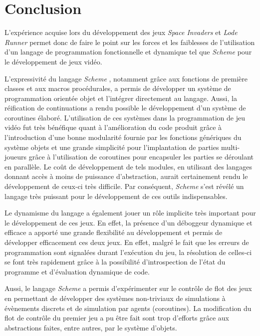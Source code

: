 \documentclass[12pt,twoside,letterpaper,francais]{book}
\newcommand{\lr}{{\textit{Lode Runner }}}
\newcommand{\si}{{\textit{Space Invaders }}}
\newcommand{\Schemelang}{{\textit{Scheme }}}
\begin{document}
\chapter{Conclusion}
L'expérience acquise lors du développement des jeux \si et \lr permet
donc de faire le point sur les forces et les faiblesses de
l'utilisation d'un langage de programmation fonctionnelle et dynamique
tel que \Schemelang pour le développement de jeux vidéo.

L'expressivité du langage \Schemelang, notamment grâce aux fonctions
de première classes et aux macros procédurales, a permis de développer
un système de programmation orientée objet et l'intégrer directement
au langage. Aussi, la réification de continuations a rendu possible le
développement d'un système de coroutines élaboré.  L'utilisation de
ces systèmes dans la programmation de jeu vidéo fut très bénéfique
quant à l'amélioration du code produit grâce à l'introduction d'une
bonne modularité fournie par les fonctions génériques du système
objets et une grande simplicité pour l'implantation de parties
multi-joueurs grâce à l'utilisation de coroutines pour encapsuler les
parties se déroulant en parallèle. Le coût de développement de tels
modules, en utilisant des langages donnant accès à moins de puissance
d'abstraction, aurait certainement rendu le développement de ceux-ci
très difficile. Par conséquent, \Schemelang s'est révélé un langage
très puissant pour le développement de ces outils indispensables.

Le dynamisme du langage a également jouer un rôle implicite très
important pour le développement de ces jeux. En effet, la présence
d'un déboggeur dynamique et efficace a apporté une grande flexibilité
au développement et permis de développer efficacement ces deux
jeux. En effet, malgré le fait que les erreurs de programmation sont
signalées durant l'exécution du jeu, la résolution de celles-ci se
font très rapidement grâce à la possibilité d'introspection de l'état
du programme et d'évaluation dynamique de code.

Aussi, le langage \Schemelang a permis d'expérimenter sur le contrôle
de flot des jeux en permettant de développer des systèmes non-triviaux
de simulations à évènements discrets et de simulation par agents
(coroutines). La modification du flot de contrôle du premier jeu a pu
être fait sont trop d'efforts grâce aux abstractions faites, entre
autres, par le système d'objets.
\end{document}
